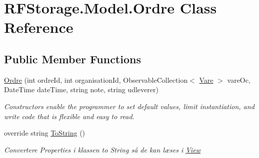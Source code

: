 \hypertarget{class_r_f_storage_1_1_model_1_1_ordre}{}\section{R\+F\+Storage.\+Model.\+Ordre Class Reference}
\label{class_r_f_storage_1_1_model_1_1_ordre}
\subsection*{Public Member Functions}
\begin{DoxyCompactItemize}
\item 
\mbox{\hyperlink{class_r_f_storage_1_1_model_1_1_ordre_acd2865d848efa7a67ceeb19450572675}{Ordre}} (int ordre\+Id, int organisation\+Id, Observable\+Collection$<$ \mbox{\hyperlink{class_r_f_storage_1_1_model_1_1_vare}{Vare}} $>$ vare\+Oc, Date\+Time date\+Time, string note, string udleverer)
\begin{DoxyCompactList}\small\item\em Constructors enable the programmer to set default values, limit instantiation, and write code that is flexible and easy to read. \end{DoxyCompactList}\item 
override string \mbox{\hyperlink{class_r_f_storage_1_1_model_1_1_ordre_a46665f66d756929acc6e7d578578a269}{To\+String}} ()
\begin{DoxyCompactList}\small\item\em Convertere Properties i klassen to String så de kan læses i \mbox{\hyperlink{namespace_r_f_storage_1_1_view}{View}} \end{DoxyCompactList}\end{DoxyCompactItemize}
